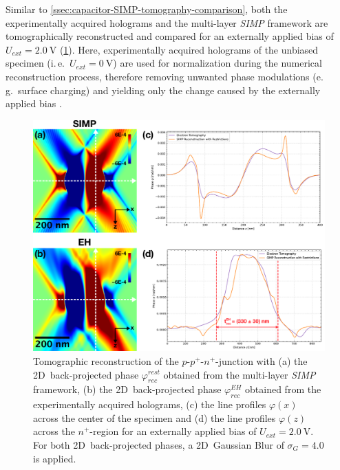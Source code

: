 Similar to \cref{ssec:capacitor-SIMP-tomography-comparison}, both the experimentally acquired holograms and the multi-layer \emph{SIMP} framework are tomographically reconstructed and compared for an externally applied bias of $U_{\mathit{ext}} = \SI{2.0}{\volt}$ (\cref{fig:ppn-junction-SIMP-EH-tomography-comparison}). Here, experimentally acquired holograms of the unbiased specimen (i.\,e.\ $U_{\mathit{ext}} = \SI{0}{\volt}$) are used for normalization during the numerical reconstruction process, therefore removing unwanted phase modulations (e.\,g.\ surface charging) and yielding only the change caused by the externally applied bias \cite{Wagner2019}.
\begin{figure}[H]
	\centering
	\includegraphics[width=\textwidth]{Figures/Results/pn-Junction/Tomography/ppn-junction-SIMP-EH-tomography-comparison.pdf}
	\caption{Tomographic reconstruction of the $p$-$p^+$-$n^+$-junction with (a) the 2D~back-projected phase $\varphi_{\mathit{rec}}^{\mathit{rest}}$ obtained from the multi-layer \emph{SIMP} framework, (b) the 2D~back-projected phase $\varphi_{\mathit{rec}}^{\mathit{EH}}$ obtained from the experimentally acquired holograms, (c) the line profiles $\varphi\left(x\right)$ across the center of the specimen and (d) the line profiles $\varphi\left(z\right)$ across the $n^+$-region for an externally applied bias of $U_{\mathit{ext}} = \SI{2.0}{\volt}$. For both 2D~back-projected phases, a 2D~Gaussian Blur of $\sigma_G = 4.0$ is applied.}
	\label{fig:ppn-junction-SIMP-EH-tomography-comparison}
\end{figure}

